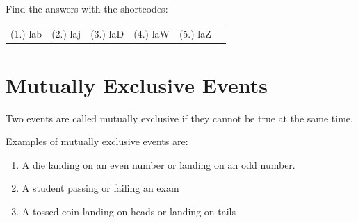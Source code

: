     
    \label{m39377*cid8}
\par {} Find the answers with the shortcodes:
 \par \begin{tabular}[h]{cccccc}
 (1.) lab  &  (2.) laj  &  (3.) laD  &  (4.) laW  &  (5.) laZ  & \end{tabular}



            \section{ Mutually Exclusive Events}
            \nopagebreak
            \label{m39377*id114732}Two events are called mutually exclusive if they cannot be
true at the same time.\par 
      \label{m39377*id114736}Examples of mutually exclusive events are:\par 
      \label{m39377*id114740}\begin{enumerate}[noitemsep, label=\textbf{\arabic*}. ] 
            \label{m39377*uid76}\item A die landing on an even number or landing on an odd
number.
\label{m39377*uid77}\item A student passing or failing an exam
\label{m39377*uid78}\item A tossed coin landing on heads or landing on tails
\end{enumerate}
        
